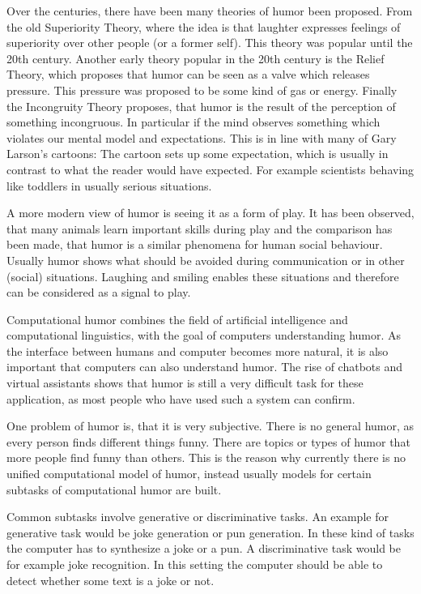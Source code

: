 \documentclass[draft,final,oneside]{vutinfth} %
\begin{document}
Over the centuries, there have been many theories of humor been proposed. From the old Superiority Theory, where the idea is that laughter expresses feelings of superiority over other people (or a former self). This theory was popular until the 20th century. Another early theory popular in the 20th century is the Relief Theory, which proposes that humor can be seen as a valve which releases pressure. This pressure was proposed to be some kind of gas or energy. Finally the Incongruity Theory proposes, that humor is the result of the perception of something incongruous. In particular if the mind observes something which violates our mental model and expectations. This is in line with many of Gary Larson's cartoons: The cartoon sets up some expectation, which is usually in contrast to what the reader would have expected. For example scientists behaving like toddlers in usually serious situations. \cite{sep-humor}

A more modern view of humor is seeing it as a form of play. It has been observed, that many animals learn important skills during play and the comparison has been made, that humor is a similar phenomena for human social behaviour. Usually humor shows what should be avoided during communication or in other (social) situations. Laughing and smiling enables these situations and therefore can be considered as a signal to play. 

Computational humor combines the field of artificial intelligence and computational linguistics, with the goal of computers understanding humor. As the interface between humans and computer becomes more natural, it is also important that computers can also understand humor. The rise of chatbots and virtual assistants shows that humor is still a very difficult task for these application, as most people who have used such a system can confirm.

One problem of humor is, that it is very subjective. There is no general humor, as every person finds different things funny. There are topics or types of humor that more people find funny than others. This is the reason why currently there is no unified computational model of humor, instead usually models for certain subtasks of computational humor are built.

Common subtasks involve generative or discriminative tasks. An example for generative task would be joke generation or pun generation. In these kind of tasks the computer has to synthesize a joke or a pun. A discriminative task would be for example joke recognition. In this setting the computer should be able to detect whether some text is a joke or not.
\end{document}
